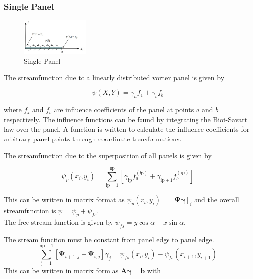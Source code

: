 \documentclass{article}
\begin{document}
\subsubsection{Single Panel}

\begin{figure}[H]
    \centering
    \includegraphics[width=0.3\textwidth]{figures/single_panel.jpg}
    \caption{Single Panel}
    \label{fig:single_panel}
\end{figure}

The streamfunction due to a linearly distributed vortex panel is given by

\begin{equation}
    \psi(X,Y) = \gamma_a f_a + \gamma_b f_b
\end{equation}

where $f_a$ and $f_b$ are influence coefficients of the panel at points $a$ and $b$ respectively.
The influence functions can be found by integrating the Biot-Savart law over the panel.
A function is written to calculate the influence coefficients for arbitrary panel points through coordinate transformations.

The streamfunction due to the superposition of all panels is given by

\begin{equation}
    \psi_p(x_i, y_i) = \sum_{\text{ip} = 1}^\text{np} \left[ \gamma_\text{ip} f_a^{(\text{ip})} + \gamma_{\text{ip}+1} f_b^{(\text{ip})} \right]
\end{equation}

This can be written in matrix format as $\psi_p(x_i, y_i) = \left[ \boldsymbol{\Psi \gamma} \right]_i$ and the overall streamfunction is $\psi = \psi_p + \psi_{fs}$. \\
The free stream function is given by $\psi_{fs} = y\cos \alpha - x\sin \alpha$.

The stream function must be constant from panel edge to panel edge.
\begin{equation}
    \sum_{\text{j} = 1}^{\text{np}+1} \left[  \boldsymbol{\Psi}_{i+1,j}  - \boldsymbol{\Psi}_{i,j} \right] \gamma_j = \psi_{fs}(x_i, y_i) - \psi_{fs}(x_{i+1}, y_{i+1})
\end{equation}
This can be written in matrix form as $ \mathbf{A} \boldsymbol{\gamma} = \boldsymbol{b}$ with
\end{document}
